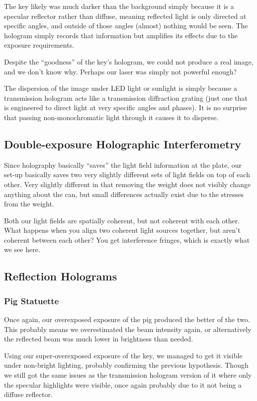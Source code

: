 \documentclass[a4paper]{scrartcl}
\begin{document}
The key likely was much darker than the background simply because it is a specular reflector rather than diffuse, meaning reflected light is only directed at specific angles, and outside of those angles (almost) nothing would be seen. The hologram simply records that information but amplifies its effects due to the exposure requirements.

Despite the ``goodness'' of the key's hologram, we could not produce a real image, and we don't know why. Perhaps our laser was simply not powerful enough?

The dispersion of the image under LED light or sunlight is simply because a transmission hologram acts like a transmission diffraction grating (just one that is engineered to direct light at very specific angles and phases). It is no surprise that passing non-monochromatic light through it causes it to disperse.

\subsection{Double-exposure Holographic Interferometry}
Since holography basically ``saves'' the light field information at the plate, our set-up basically saves two very slightly different sets of light fields on top of each other. Very slightly different in that removing the weight does not visibly change anything about the can, but small differences actually exist due to the stresses from the weight.

Both our light fields are spatially coherent, but not coherent with each other. What happens when you align two coherent light sources together, but aren't coherent between each other? You get interference fringes, which is exactly what we see here.

\subsection{Reflection Holograms}
\subsubsection{Pig Statuette}
Once again, our overexposed exposure of the pig produced the better of the two. This probably means we overestimated the beam intensity again, or alternatively the reflected beam was much lower in brightness than needed.

Using our super-overexposed exposure of the key, we managed to get it visible under non-bright lighting, probably confirming the previous hypothesis. Though we still got the same issues as the transmission hologram version of it where only the specular highlights were visible, once again probably due to it not being a diffuse reflector.

\end{document}
